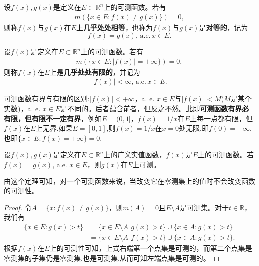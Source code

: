 \documentclass[../../main.tex]{subfiles}
\begin{document}
\begin{definition}
设$f(x), g(x)$是定义在$E \subset \mathbb{R}^n$上的可测函数。若有
\begin{align*}
m(\{x \in E: f(x) \neq g(x)\}) = 0,
\end{align*}
则称$f(x)$与$g(x)$在$E$上\textbf{几乎处处相等}，也称为$f(x)$与$g(x)$是\textbf{对等的}，记为$$f(x) = g(x),\,\mathrm{a}.\mathrm{e}.\,x \in E.$$

设$f(x)$是定义在$E \subset \mathbb{R}^n$上的可测函数。若有
\begin{align*}
m(\{x \in E: |f(x)| = +\infty\}) = 0,
\end{align*}
则称$f(x)$在$E$上是\textbf{几乎处处有限的}，并记为
\begin{align*}
|f(x)| < \infty,\,\mathrm{a}.\mathrm{e}.\,x \in E.
\end{align*}
\end{definition}
\begin{remark}
可测函数有界与有限的区别:$|f(x)| < +\infty$，a. e. $x \in E$与$|f(x)| < M$($M$是某个实数)，a. e. $x \in E$是不同的。后者蕴含前者，但反之不然。此即\textbf{可测函数有界必有限，但有限不一定有界}，例如\(E = (0, 1]\)，\(f(x) = 1/x\)在\(E\)上每一点都有限，但\(f(x)\)在\(E\)上无界.如果$E=[0,1]$,则\(f(x) = 1/x\)在$x=0$处无限,即$f(0)=+\infty$,也即$\{x\in E:f(x)=+\infty\}={0}.$
\end{remark}

\begin{theorem}
设$f(x),g(x)$是定义在$E \subset \mathbb{R}^n$上的广义实值函数，$f(x)$是$E$上的可测函数。若$f(x) = g(x)$, a.e. $x \in E$，则$g(x)$在$E$上可测。
\end{theorem}
\begin{remark}
由这个定理可知，对一个可测函数来说，当改变它在零测集上的值时不会改变函数的可测性。 
\end{remark}
\begin{proof}
令$A = \{x: f(x) \neq g(x)\}$，则$m(A) = 0$且$E \setminus A$是可测集。对于$t \in \mathbb{R}$，我们有
\begin{align*}
\{x \in E: g(x) > t\} 
&= \{x \in E \setminus A: g(x) > t\} \cup \{x \in A: g(x) > t\} \\
&= \{x \in E \setminus A: f(x) > t\} \cup \{x \in A: g(x) > t\}.
\end{align*}
根据$f(x)$在$E$上的可测性可知，上式右端第一个点集是可测的，而第二个点集是零测集的子集仍是零测集,也是可测集.从而可知左端点集是可测的。
\end{proof}
\end{document}

